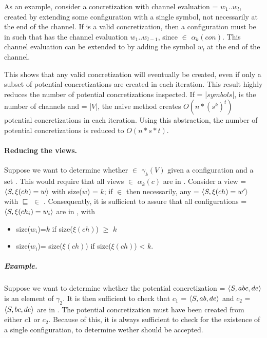 As an example, consider a concretization with channel evaluation  = $w_1..w_l$, created by extending some configuration with a single symbol, not necessarily at the end of the channel. If  is a valid concretization, then a configuration  must be in  such that  has the channel evaluation $w_1..w_{l-1}$, since  $\in$ $\alpha_k(con)$. This channel evaluation can be extended to  by adding the symbol $w_l$ at the end of the channel.

This shows that any valid concretization will eventually be created, even if only a subset of potential concretizations are created in each iteration. This result highly reduces the number of potential concretizations inspected. If  = |$symbols$|,  is the number of channels and  = |$V$|, the naive method creates $O(n*(s^k)^t)$ potential concretizations in each iteration. Using this abstraction, the number of potential concretizations is reduced to $O(n*s*t)$.

\paragraph{Reducing the views.}
Suppose we want to determine whether  $\in$ $\gamma_k(V)$ given a configuration  and a set . This would require that all views  $\in$ $\alpha_k(c)$ are in . Consider a view  = $\langle S, \xi(ch)=w\rangle$ with size($w$) = $k$; if  $\in$  then necessarily, any  = $\langle S, \xi(ch)=w'\rangle$ with  $\sqsubseteq$  $\in$ . Consequently, it is sufficient to assure that all configurations  = $\langle S,\xi(ch_i)=w_i\rangle$ are in , with

\begin{itemize}
\item
size($w_i$)=$k$ if size($\xi(ch)$) $\geq$ $k$
\item
size($w_i$)= size($\xi(ch)$) if size($\xi(ch)$) < $k$.
\end{itemize}

\subparagraph{Example.} Suppose we want to determine whether the potential concretization  = $\langle S, abc, de\rangle$ is an element of $\gamma_2$. It is then sufficient to check that $c_1$ = $\langle S,ab,de\rangle$ and $c_2$ = $\langle S,bc ,de\rangle$ are in . The potential concretization must have been created from either $c1$ or $c_2$. Because of this, it is always sufficient to check for the existence of a single configuration, to determine wether  should be accepted.
\\\\

